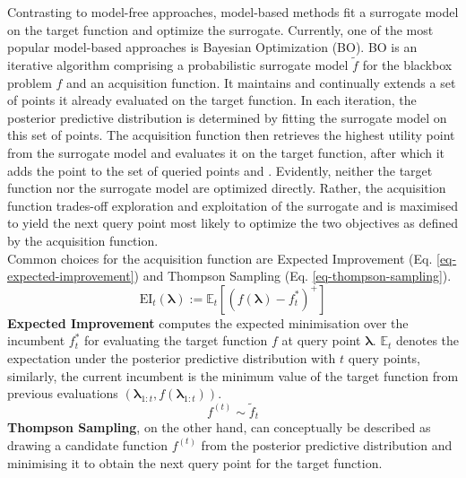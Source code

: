 \documentclass[twoside,11pt]{article}
\begin{document}
Contrasting to model-free approaches, model-based methods fit a surrogate model on the target function and optimize the surrogate.
Currently, one of the most popular model-based approaches is Bayesian Optimization (BO).
BO is an iterative algorithm comprising a probabilistic surrogate model $\tilde{f}$ for the blackbox problem $f$ and an acquisition function.
It maintains and continually extends a set of points it already evaluated on the target function.
In each iteration, the posterior predictive distribution is determined by fitting the surrogate model on this set of points.
The acquisition function then retrieves the highest utility point from the surrogate model and evaluates it on the target function, after which it adds the point
to the set of queried points \citep[chap. 1.3.2]{feurer_hyperparameter_2019} and \citep[pp. 2f]{frazier2018tutorialbayesianoptimization}.
Evidently, neither the target function nor the surrogate model are optimized directly. Rather, the acquisition function trades-off exploration and exploitation of
the surrogate and is maximised to yield the next query point most likely to optimize the two objectives as defined by the acquisition function.
\\
Common choices for the acquisition function are Expected Improvement (Eq. \ref{eq-expected-improvement}) and Thompson Sampling (Eq. \ref{eq-thompson-sampling}).
\begin{equation}
  \text{EI}_t(\boldsymbol\lambda):=\mathbb{E}_t[(f(\boldsymbol\lambda)-f_t^*)^+]
  \label{eq-expected-improvement}
\end{equation}
\textbf{Expected Improvement} computes the expected minimisation over the incumbent $f_t^*$ for evaluating the target function $f$ at query point $\boldsymbol\lambda$.
$\mathbb{E}_t$ denotes the expectation under the posterior predictive distribution with $t$ query points, similarly, the current incumbent is the minimum value
of the target function from previous evaluations $(\boldsymbol\lambda_{1:t},f(\boldsymbol\lambda_{1:t}))$. \citep[p. 7]{frazier2018tutorialbayesianoptimization}
\begin{equation}  %
  f^{(t)}\sim\tilde{f}_t
  \label{eq-thompson-sampling}
\end{equation}
\textbf{Thompson Sampling}, on the other hand, can conceptually be described as drawing a candidate function $f^{(t)}$ from the posterior predictive distribution and
minimising it to obtain the next query point for the target function. \citep[p. 161]{7352306}
\\
\end{document}
